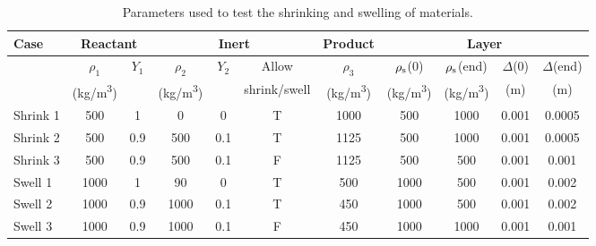 \documentclass[11pt]{book}
\begin{document}
\begin{table}[!htb]
\centering
\caption[Parameters for shrinking and swelling of materials]{Parameters used to test the shrinking and swelling of materials.}
\label{shrink_swell_table}
\begin{tabular}{|l|c|c|c|c|c|c|c|c|c|c|}
\hline
Case     & \multicolumn{2}{|c|}{Reactant}  &  \multicolumn{3}{|c|}{Inert} & Product & \multicolumn{4}{|c|}{Layer} \\ \hline
         & $\rho_1$  & $Y_1$ & $\rho_2$  & $Y_2$ & Allow        & $\rho_3$  & $\rho_{\rm s}$(0) & $\rho_{\rm s}$(end) & $\Delta$(0) & $\Delta$(end) \\
         & (\si{kg/m^3})&       & (\si{kg/m^3})&       & shrink/swell & (\si{kg/m^3})& (\si{kg/m^3})  & (\si{kg/m^3})    & (m)         & (m) \\ \hline

Shrink 1 & 500 & 1   & 0   & 0   & T   & 1000   & 500 & 1000   & 0.001  & 0.0005 \\
Shrink 2 & 500 &0.9  &500  &0.1  &T &1125 &500  &1000 &0.001   &0.0005 \\
Shrink 3 & 500 &0.9  &500  &0.1  &F &1125 &500  &500  &0.001   &0.001 \\
Swell 1          & 1000 &1 &90   &0 &T &500  &1000 &500  &0.001   &0.002 \\
Swell 2          & 1000 &0.9  &1000 &0.1  &T &450  &1000 &500  &0.001   &0.002 \\
Swell 3          & 1000 &0.9  &1000 &0.1  &F &450  &1000 &1000 &0.001   &0.001 \\ \hline
\end{tabular}
\end{table}
\end{document}
